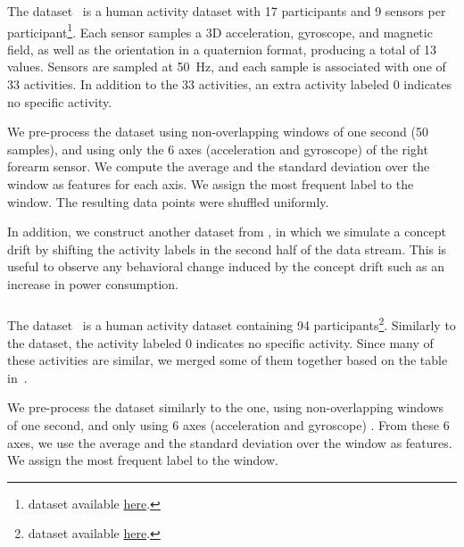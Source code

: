 \subsubsection{\banosdataset}
The \banosdataset dataset~\cite{Banos_2014} is a
human activity dataset with 17 participants
and 9 sensors per
participant\footnote{\banosdataset dataset
available
\href{https://archive.ics.uci.edu/ml/datasets/REALDISP+Activity+Recognition+Dataset\#:\~:text=The\%20REALDISP\%20(REAListic\%20sensor\%20DISPlacement,\%2Dplacement\%20and\%20induced\%2Ddisplacement.}{here}.}. Each sensor samples a 3D
acceleration, gyroscope, and magnetic field, as
well as the orientation in a quaternion format,
producing a total of 13 values.  Sensors are
sampled at 50~Hz, and each sample is associated
with one of 33 activities. In addition to the 33
activities, an extra activity labeled 0 indicates
no specific activity.

We pre-process the \banosdataset dataset using
non-overlapping windows of one second (50
samples), and using only the 6 axes (acceleration
and gyroscope)
of the right forearm sensor. We compute the average and the standard deviation over the
window as features for each axis. We assign the most
frequent label to the window.  The resulting data
points were shuffled uniformly.

In addition, we construct another dataset from \banosdataset, in which we
simulate a concept drift by shifting the activity labels in the
second half of the data stream. This is useful to
observe any behavioral change induced by the
concept drift such as an increase in power
consumption.

\subsubsection{\recofitdataset}
The \recofitdataset dataset~\cite{recofit} is a
human activity dataset containing 94
participants\footnote{\recofitdataset dataset
available
\href{https://msropendata.com/datasets/799c1167-2c8f-44c4-929c-227bf04e2b9a}{here}.}. Similarly to the \banosdataset
dataset, the activity labeled 0 indicates no
specific activity.
Since many of these activities are similar, we
merged  some of them together based on the table
in~\cite{behzad2019}. 

We pre-process the dataset similarly to the
\banosdataset one, using non-overlapping windows of
one second, and only using 6 axes (acceleration
and gyroscope) 
. From these 6 axes, we use the average and the standard deviation
over the window as features. We assign the most
frequent label to the window.


